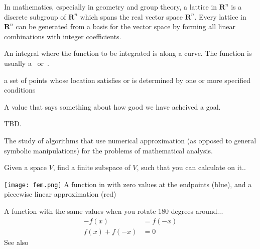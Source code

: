 \begin{definition}[Lattice]
    In mathematics, especially in geometry and group theory, a lattice in
    $\mathbf{R}^n$ is a discrete subgroup of $\mathbf{R}^n$ which spans the real
    vector space $\mathbf{R}^n$. Every lattice in $\mathbf{R}^n$ can be generated
    from a basis for the vector space by forming all linear combinations with
    integer coefficients. 

\end{definition}

\begin{definition}
    An integral where the function to be integrated is along a curve.
    The function is usually a~ or~.

\end{definition}

\begin{definition}[Locus]
    a set of points whose location satisfies or is determined by one or more
    specified conditions

\end{definition}

\begin{definition}
    A value that says something about how good we have acheived a goal.
\end{definition}

\begin{definition}[Moment]
    TBD.
\end{definition}

\begin{definition}
    The study of algorithms that use numerical approximation (as opposed to
    general symbolic manipulations) for the problems of mathematical analysis.

    Given a space $V$, find a finite subspace of $V$, such that you can
    calculate on it..

    \texttt{[image: fem.png]}
    A function in  with zero values at the endpoints (blue), and a piecewise
    linear approximation (red)

\end{definition}

\begin{definition}\label{oddfunc}
    A function with the same values when you rotate 180 degrees around...
    \begin{align}
        - f(x) &= f(-x) \\
        f(x) + f(-x) &= 0
    \end{align}
    See also~
\end{definition}

